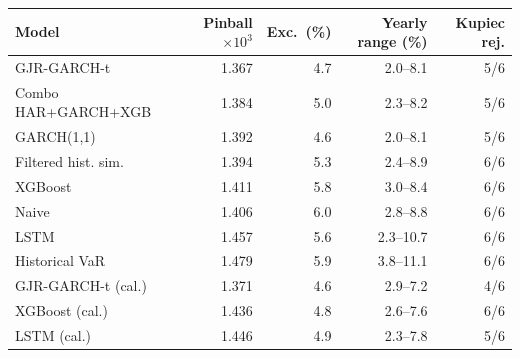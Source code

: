 \begin{tabular}{lrrrr}
\hline
Model & Pinball$\times10^3$ & Exc.\ (\%) & Yearly range (\%) & Kupiec rej. \\
\hline
GJR-GARCH-t & 1.367 & 4.7 & 2.0--8.1 & 5/6 \\
Combo HAR+GARCH+XGB & 1.384 & 5.0 & 2.3--8.2 & 5/6 \\
GARCH(1,1) & 1.392 & 4.6 & 2.0--8.1 & 5/6 \\
Filtered hist. sim. & 1.394 & 5.3 & 2.4--8.9 & 6/6 \\
XGBoost & 1.411 & 5.8 & 3.0--8.4 & 6/6 \\
Naive & 1.406 & 6.0 & 2.8--8.8 & 6/6 \\
LSTM & 1.457 & 5.6 & 2.3--10.7 & 6/6 \\
Historical VaR & 1.479 & 5.9 & 3.8--11.1 & 6/6 \\
GJR-GARCH-t (cal.) & 1.371 & 4.6 & 2.9--7.2 & 4/6 \\
XGBoost (cal.) & 1.436 & 4.8 & 2.6--7.6 & 6/6 \\
LSTM (cal.) & 1.446 & 4.9 & 2.3--7.8 & 5/6 \\
\hline
\end{tabular}
